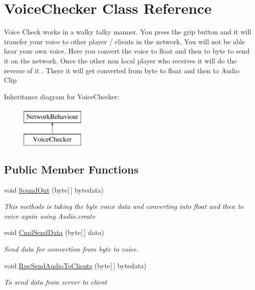 \hypertarget{class_voice_checker}{}\section{Voice\+Checker Class Reference}
\label{class_voice_checker}


Voice Check works in a walky talky manner. You press the grip button and it will transfer your voice to other player / clients in the network. You will not be able hear your own voice. Here you convert the voice to float and then to byte to send it on the network. Once the other non local player who receives it will do the reverse of it . There it will get converted from byte to float and then to Audio Clip  


Inheritance diagram for Voice\+Checker\+:\begin{figure}[H]
\begin{center}
\leavevmode
\includegraphics[height=2.000000cm]{class_voice_checker}
\end{center}
\end{figure}
\subsection*{Public Member Functions}
\begin{DoxyCompactItemize}
\item 
void \mbox{\hyperlink{class_voice_checker_aa61d463472d051565405e77c8e4bae55}{Sound\+Out}} (byte\mbox{[}$\,$\mbox{]} bytedata)
\begin{DoxyCompactList}\small\item\em This methods is taking the byte voice data and converting into float and then to voice again using Audio.\+create \end{DoxyCompactList}\item 
void \mbox{\hyperlink{class_voice_checker_a644fb76d9672b803832faa1a2f59ea37}{Cmd\+Send\+Data}} (byte\mbox{[}$\,$\mbox{]} data)
\begin{DoxyCompactList}\small\item\em Send data for comvertion from byte to voice. \end{DoxyCompactList}\item 
void \mbox{\hyperlink{class_voice_checker_acb5390e90e3b8cff019e2780a32be0d3}{Rpc\+Send\+Audio\+To\+Clients}} (byte\mbox{[}$\,$\mbox{]} bytedata)
\begin{DoxyCompactList}\small\item\em To send data from server to client \end{DoxyCompactList}\end{DoxyCompactItemize}


